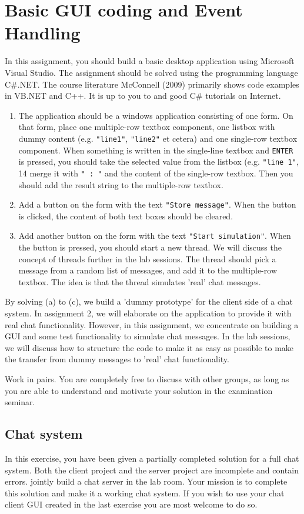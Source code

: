\documentclass{article}
\begin{document}
\section{Basic GUI coding and Event Handling}
In this assignment, you should build a basic desktop application using Microsoft Visual Studio. The assignment should be solved using the programming language C\#.NET. The course literature McConnell (2009) primarily shows code examples in VB.NET and C++. It is up to you to and good C\# tutorials on Internet.
\begin{enumerate}
  \item The application should be a windows application consisting of one form. On that form, place one multiple-row textbox component, one listbox with dummy content (e.g. \texttt{"line1"}, \texttt{"line2"} et cetera) and one single-row textbox component. When something is written in the single-line textbox and \texttt{ENTER} is pressed, you should take the selected value from the listbox (e.g. \texttt{"line 1"}, 14 merge it with \texttt{" : "} and the content of the single-row textbox. Then you should add the result string to the multiple-row textbox.
  \item Add a button on the form with the text \texttt{"Store message"}. When the button is clicked, the content of both text boxes should be cleared.
  \item Add another button on the form with the text \texttt{"Start simulation"}. When the button is pressed, you should start a new thread. We will discuss the concept of threads further in the lab sessions. The thread should pick a message from a random list of messages, and add it to the multiple-row textbox. The idea is that the thread simulates 'real' chat messages.
\end{enumerate}
By solving (a) to (c), we build a 'dummy prototype' for the client side of a chat system. In assignment 2, we will elaborate on the application to provide it with real chat functionality. However, in this assignment, we concentrate on building a GUI and some test functionality to simulate chat messages. In the lab sessions, we will discuss how to structure the code to make it as easy as possible to make the transfer from dummy messages to 'real' chat functionality.

Work in pairs. You are completely free to discuss with other groups, as long as you are able to understand and motivate your solution in the examination seminar.
\subsection{Chat system}
In this exercise, you have been given a partially completed solution for a full chat system. Both the client project and the server project are incomplete and contain errors. jointly build a chat server in the lab room. Your mission is to complete this solution and make it a working chat system. If you wish to use your chat client GUI created in the last exercise you are most welcome to do so.
\end{document}
